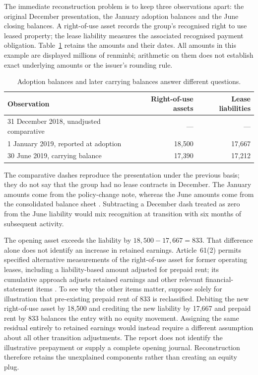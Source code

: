 The immediate reconstruction problem is to keep three observations apart:
the original December presentation, the January adoption balances and the
June closing balances. A right-of-use asset records the group's recognised
right to use leased property; the lease liability measures the associated
recognised payment obligation. Table~\ref{tab:pingan-lease-balances} retains
the amounts and their dates. All amounts in this example are displayed
millions of renminbi; arithmetic on them does not establish exact underlying
amounts or the issuer's rounding rule.

\begin{table}[!ht]
\centering
\caption{Adoption balances and later carrying balances answer different questions.}
\label{tab:pingan-lease-balances}
\begin{tabular}{@{}lrr@{}}
\toprule
Observation & Right-of-use assets & Lease liabilities \\
\midrule
31 December 2018, unadjusted comparative & --- & --- \\
1 January 2019, reported at adoption & 18,500 & 17,667 \\
30 June 2019, carrying balance & 17,390 & 17,212 \\
\bottomrule
\end{tabular}
\end{table}

The comparative dashes reproduce the presentation under the previous basis;
they do not say that the group had no lease contracts in December. The
January amounts come from the policy-change note, whereas the June amounts
come from the consolidated balance sheet
\citep[pp.\ 99--100, 112]{pingan2019asbe}. Subtracting a December dash
treated as zero from the June liability would mix recognition at transition
with six months of subsequent activity.

The opening asset exceeds the liability by $18{,}500-17{,}667=833$. That
difference alone does not identify an increase in retained earnings.
Article~61(2) permits specified alternative measurements of the right-of-use
asset for former operating leases, including a liability-based amount
adjusted for prepaid rent; its cumulative approach adjusts retained earnings
and other relevant financial-statement items
\citep[attachment, art.\ 61(2)]{moflease2018}. To see why the other items
matter, suppose solely for illustration that pre-existing prepaid rent of
833 is reclassified. Debiting the new right-of-use asset by 18,500 and
crediting the new liability by 17,667 and prepaid rent by 833 balances the
entry with no equity movement. Assigning the same residual entirely to
retained earnings would instead require a different assumption about all
other transition adjustments. The report does not identify the illustrative
prepayment or supply a complete opening journal. Reconstruction therefore
retains the unexplained components rather than creating an equity plug.

